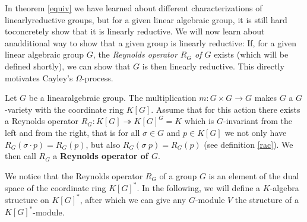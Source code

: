 
In theorem \ref{equiv} we have learned about different characterizations of linearly\linebreak reductive groups, but for a given linear algebraic group, it is still hard to\linebreak concretely show that it is linearly reductive.
We will now learn about an\linebreak additional way to show that a given group is linearly reductive:  If, for a given linear algebraic group $G$, the \textit{Reynolds operator $R_G$ of $G$} exists (which will be defined shortly), we can show that $G$ is then linearly reductive.
This directly motivates Cayley's $\Omega$-process.

\begin{definition}\label{rengr}
  Let $G$ be a linear\linebreak algebraic group.
  The multiplication $m \colon G\times G \rightarrow G$ makes $G$ a $G$-variety with the coordinate ring $K[G]$.
  Assume that for this action there exists a Reynolds \linebreak operator $R_G \colon K[G] \twoheadrightarrow K[G]^G = K$ which is $G$-invariant from the left and from the right, that is for all $\sigma \in G$ and $p \in K[G]$ we not only have $R_G(\sigma\cdot p)=R_G(p)$, but also $R_G(\sigma\dot{\phantom{.}}p)=R_G(p)$ (see definition \ref{rac}).
  We then call $R_G$ a \textbf{Reynolds \linebreak operator of $G$}.
\end{definition}

We notice that the Reynolds operator $R_G$ of a group $G$ is an element of the dual space of the coordinate ring $K[G]^\ast$.
In the following, we will define a $K$-algebra structure on $K[G]^\ast$, after which we can give any $G$-module $V$ the structure of a $K[G]^\ast$-module.


